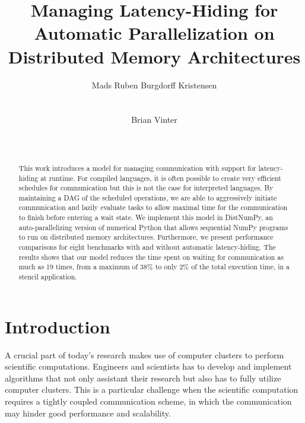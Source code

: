 \documentclass{acm_proc_article-sp}
\begin{document}
\title{Managing Latency-Hiding for Automatic Parallelization on Distributed Memory Architectures}

\author{
\alignauthor
Mads Ruben Burgdorff Kristensen\\
       \\
       \\
\alignauthor
Brian Vinter\\
       \\
       \\
}

\maketitle

\begin{abstract}
This work introduces a model for managing communication with support for latency-hiding at runtime. For compiled languages, it is often possible to create very efficient schedules for communication but this is not the case for interpreted languages. By maintaining a DAG of the scheduled operations, we are able to aggressively initiate communication and lazily evaluate tasks to allow maximal time for the communication to finish before entering a wait state. We implement this model in DistNumPy, an auto-parallelizing version of numerical Python that allows sequential NumPy programs to run on distributed memory architectures. Furthermore, we present performance comparisons for eight benchmarks with and without automatic latency-hiding. The results shows that our model reduces the time spent on waiting for communication as much as 19 times, from a maximum of 38\% to only 2\% of the total execution time, in a stencil application.
\end{abstract}

\section{Introduction}
A crucial part of today's research makes use of computer clusters to perform scientific computations. Engineers and scientists has to develop and implement algorithms that not only assistant their research but also has to fully utilize computer clusters. This is a particular challenge when the scientific computation requires a tightly coupled communication scheme, in which the communication may hinder good performance and scalability.
\end{document}
